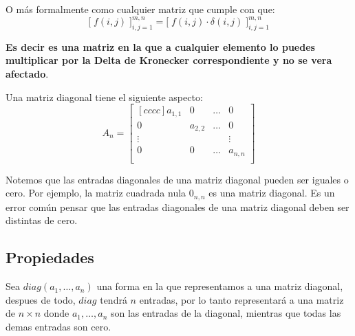 \documentclass[12pt, fleqn]{report}                             %
\theoremstyle{break}                                            %
\newcommand{\BigBrackets}[1]    {\Big[ \; #1 \; \Big]}          %
\begin{document}
                O más formalmente como cualquier matriz que cumple con que:
                \begin{equation*}
                    \BigBrackets{f(i,j)}_{i, j = 1}^{m, n} 
                        =
                    \BigBrackets{f(i,j) \cdot \delta(i,j) }_{i, j = 1}^{m, n}  
                \end{equation*}

                \textbf{Es decir es una matriz en la que a cualquier elemento lo puedes multiplicar 
                por la Delta de Kronecker correspondiente y no se vera afectado}.

                Una matriz diagonal tiene el siguiente aspecto:
                \begin{equation*}
                    A_n =
                    \begin{bmatrix}[cccc]
                        a_{1,1} & 0         & \dots & 0         \\
                        0       & a_{2,2}   & \dots & 0         \\
                        \vdots  &           &       & \vdots    \\
                        0       & 0         & \dots & a_{n,n}   \\
                    \end{bmatrix}
                \end{equation*}

                Notemos que las entradas diagonales de una matriz diagonal pueden ser iguales o cero.
                Por ejemplo, la matriz cuadrada nula $0_{n, n}$ es una matriz diagonal.
                Es un error común pensar que las entradas diagonales de una matriz diagonal deben
                ser distintas de cero.


            \clearpage
            \subsection{Propiedades}

                Sea $diag(a_1, \dots, a_n)$ una forma en la que representamos a una matriz diagonal,
                despues de todo, $diag$ tendrá $n$ entradas, por lo tanto representará a una matriz
                de $n \times n$ donde $a_1, \dots, a_n$ son las entradas de la diagonal, mientras que
                todas las demas entradas son cero.
\end{document}
